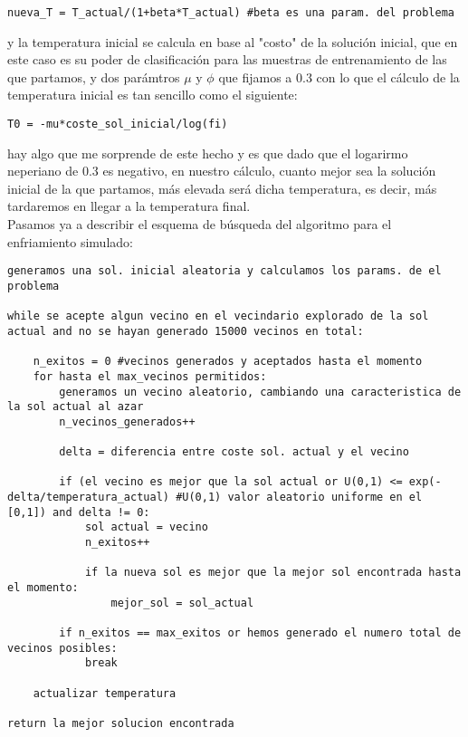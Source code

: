 \documentclass[10pt,a4paper]{article}
\begin{document}
\begin{lstlisting}
nueva_T = T_actual/(1+beta*T_actual) #beta es una param. del problema
\end{lstlisting}

y la temperatura inicial se calcula en base al "costo" de la solución inicial, que en este caso es su poder de clasificación para las muestras de entrenamiento de las que partamos, y dos parámtros $\mu$ y $\phi$ que fijamos a 0.3 con lo que el cálculo de la temperatura inicial es tan sencillo como el siguiente:\\

\begin{lstlisting}
T0 = -mu*coste_sol_inicial/log(fi)
\end{lstlisting}

hay algo que me sorprende de este hecho y es que dado que el logarirmo neperiano de 0.3 es negativo, en nuestro cálculo, cuanto mejor sea la solución inicial de la que partamos, más elevada será dicha temperatura, es decir, más tardaremos en llegar a la temperatura final.\\

Pasamos ya a describir el esquema de búsqueda del algoritmo para el enfriamiento simulado:\\

\begin{lstlisting}
generamos una sol. inicial aleatoria y calculamos los params. de el problema

while se acepte algun vecino en el vecindario explorado de la sol actual and no se hayan generado 15000 vecinos en total:

	n_exitos = 0 #vecinos generados y aceptados hasta el momento
	for hasta el max_vecinos permitidos:
		generamos un vecino aleatorio, cambiando una caracteristica de la sol actual al azar
		n_vecinos_generados++
		
		delta = diferencia entre coste sol. actual y el vecino
		
		if (el vecino es mejor que la sol actual or U(0,1) <= exp(-delta/temperatura_actual) #U(0,1) valor aleatorio uniforme en el [0,1]) and delta != 0:
			sol actual = vecino
			n_exitos++
		
			if la nueva sol es mejor que la mejor sol encontrada hasta el momento:
				mejor_sol = sol_actual
			
		if n_exitos == max_exitos or hemos generado el numero total de vecinos posibles:
			break
			
	actualizar temperatura	
	
return la mejor solucion encontrada
\end{lstlisting}
\end{document}
